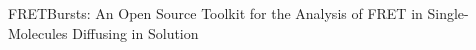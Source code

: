 FRETBursts: An Open Source Toolkit for the Analysis of FRET in Single-Molecules Diffusing in Solution
